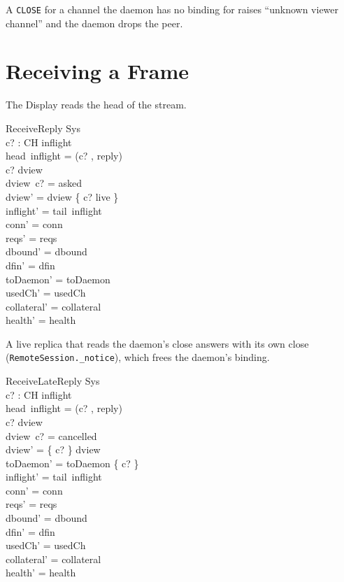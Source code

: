 \documentclass[a4paper,10pt,fleqn]{article}
\begin{document}
A \texttt{CLOSE} for a channel the daemon has no binding for raises
``unknown viewer channel'' and the daemon drops the peer.

\section{Receiving a Frame}

The Display reads the head of the stream.

\begin{schema}{ReceiveReply}
  \Delta Sys \\
  c? : CH
\where
  inflight \neq \langle \rangle \\
  head~inflight = (c? , reply) \\
  c? \in \dom dview \\
  dview~c? = asked \\
  dview' = dview \oplus \{ c? \mapsto live \} \\
  inflight' = tail~inflight \\
  conn' = conn \\
  reqs' = reqs \\
  dbound' = dbound \\
  dfin' = dfin \\
  toDaemon' = toDaemon \\
  usedCh' = usedCh \\
  collateral' = collateral \\
  health' = health
\end{schema}

A live replica that reads the daemon's close answers with its own close (\texttt{RemoteSession.\_notice}), which frees the daemon's binding.

\begin{schema}{ReceiveLateReply}
  \Delta Sys \\
  c? : CH
\where
  inflight \neq \langle \rangle \\
  head~inflight = (c? , reply) \\
  c? \in \dom dview \\
  dview~c? = cancelled \\
  dview' = \{ c? \} \ndres dview \\
  toDaemon' = toDaemon \cup \{ c? \} \\
  inflight' = tail~inflight \\
  conn' = conn \\
  reqs' = reqs \\
  dbound' = dbound \\
  dfin' = dfin \\
  usedCh' = usedCh \\
  collateral' = collateral \\
  health' = health
\end{schema}
\end{document}

